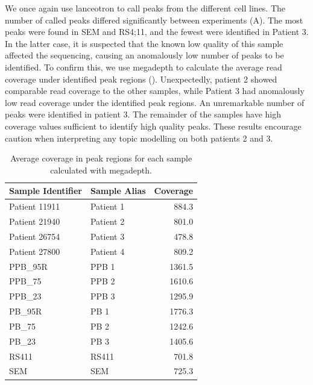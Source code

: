 We once again use lanceotron to call peaks from the different cell lines. The number of called peaks differed significantly between experiments (A). The most peaks were found in SEM and RS4;11, and the fewest were identified in Patient 3. In the latter case, it is suspected that the known low quality of this sample affected the sequencing, causing an anomalously low number of peaks to be identified. To confirm this, we use megadepth to calculate the average read coverage under identified peak regions \cite{Wilks2021} (). Unexpectedly, patient 2 showed comparable read coverage to the other samples, while Patient 3 had anomalously low read coverage under the identified peak regions. An unremarkable number of peaks were identified in patient 3. The remainder of the samples have high coverage values sufficient to identify high quality peaks. These results encourage caution when interpreting any topic modelling on both patients 2 and 3.  


\begin{table}[]
    \centering
    \begin{tabular}{@{}llr@{}}
    \toprule
    Sample Identifier & Sample Alias & Coverage \\ \midrule
    Patient 11911     & Patient 1    & 884.3                        \\
    Patient 21940     & Patient 2    & 801.0                        \\
    Patient 26754     & Patient 3    & 478.8                        \\
    Patient 27800     & Patient 4    & 809.2                        \\
    PPB\_95R          & PPB 1        & 1361.5                       \\
    PPB\_75           & PPB 2        & 1610.6                       \\
    PPB\_23           & PPB 3        & 1295.9                       \\
    PB\_95R           & PB 1         & 1776.3                       \\
    PB\_75            & PB 2         & 1242.6                       \\
    PB\_23            & PB 3         & 1405.6                       \\
    RS411             & RS411        & 701.8                        \\
    SEM               & SEM          & 725.3                        \\ \bottomrule
    \end{tabular}
    \caption{Average coverage in peak regions for each sample calculated with megadepth.}
    \label{table:mll_cov}
\end{table}

